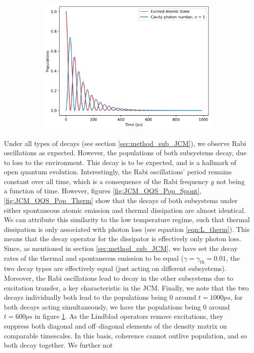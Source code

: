 \documentclass[12pt]{article}
\begin{document}
\begin{figure}[H]
    \vspace{0.5cm}
    
    \begin{subfigure}{0.45\textwidth} 
        \centering
        \includegraphics[width=\linewidth]{Research Project/Code/results/JCM/OQS_Pop_Both.png}
        \caption{}
         \label{fig:JCM_OQS_Pop_Both}
    \end{subfigure}
    \hfill
    \caption{}
    \label{fig:JCM_OQS_Pop}
\end{figure}

Under all types of decays (see section \ref{sec:method_sub_JCM}), we observe Rabi oscillations as expected. However, the populations of both subsystems decay, due to loss to the environment. This decay is to be expected, and is a hallmark of open quantum evolution. Interestingly, the Rabi oscillations' period remains constant over all time, which is a consequence of the Rabi frequency $g$ not being a function of time. However, figures \ref{fig:JCM_OQS_Pop_Spont}, \ref{fig:JCM_OQS_Pop_Therm} show that the decays of both subsystems under either spontaneous atomic emission and thermal dissipation are almost identical. We can attribute this similarity to the low temperature regime, such that thermal dissipation is only associated with photon loss (see equation \eqref{eqn:L_therm}). This means that the decay operator for the dissipator is effectively only photon loss. Since, as mentioned in section \ref{sec:method_sub_JCM}, we have set the decay rates of the thermal and spontaneous emission to be equal ($\gamma = \gamma_{\scriptscriptstyle \text{th}} =0.01$, the two decay types are effectively equal (just acting on different subsystems). Moreover, the Rabi oscillations lead to decay in the other subsystems due to excitation transfer, a key characteristic in the JCM. Finally, we note that the two decays individually both lead to the populations being 0 around $t = 1000 ps$, for both decays acting simultaneously, we have the populations being 0 around $t = 600 ps$ in figure \ref{fig:JCM_OQS_Pop_Both}. As the Lindblad operators remove excitations, they suppress both diagonal and off--diagonal elements of the density matrix on comparable timescales. In this basis, coherence cannot outlive population, and so both decay together. We further not
\end{document}
